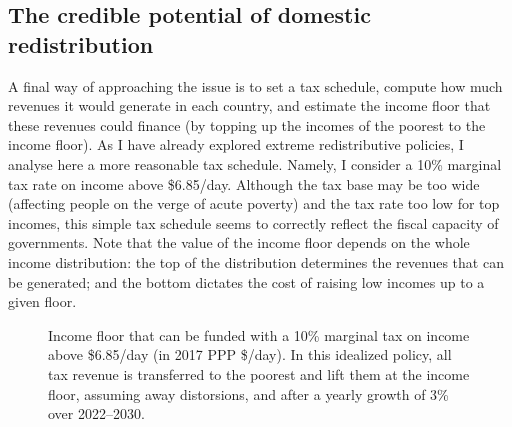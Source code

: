 
\subsection{The credible potential of domestic redistribution}

A final way of approaching the issue is to set a tax schedule, compute how much revenues it would generate in each country, and estimate the income floor that these revenues could finance (by topping up the incomes of the poorest to the income floor). As I have already explored extreme redistributive policies, I analyse here a more reasonable tax schedule. Namely, I consider a 10\% marginal tax rate on income above \$6.85/day. Although the tax base may be too wide (affecting people on the verge of acute poverty) %
and the tax rate too low for top incomes, 
this simple tax schedule seems to correctly reflect the fiscal capacity of governments. Note that the value of the income floor depends on the whole income distribution: the top of the distribution determines the revenues that can be generated; and the bottom dictates the cost of raising low incomes up to a given floor. 

\begin{figure}[b!]
  \caption[Income floor of 10\% tax above \$6.85/day in 2030 after 3\% growth.]{Income floor that can be funded with a 10\% marginal tax on income above \$6.85/day (in 2017 PPP \$/day). In this idealized policy, all tax revenue is transferred to the poorest and lift them at the income floor, assuming away distorsions, and after a yearly growth of 3\% over 2022--2030. 
  }\label{fig:demogrant_7__10}
\end{figure}

